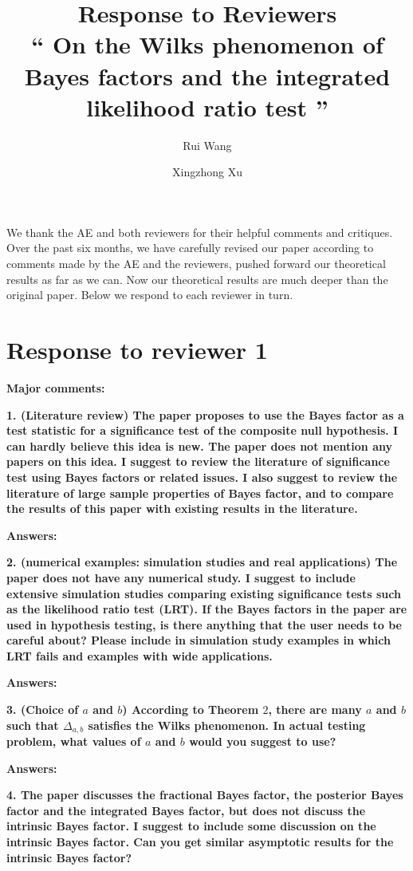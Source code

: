 \documentclass[11pt]{article}
\title{Response to Reviewers\\
    ``
    On the Wilks phenomenon of Bayes factors and the integrated likelihood ratio test
    ''
}
\author[1]{Rui Wang}
\author[1,2]{Xingzhong Xu}
\affil[1]{
School of Mathematics and Statistics, Beijing Institute of Technology, Beijing 
    100081,China
}
\affil[2]{
Beijing Key Laboratory on MCAACI, Beijing Institute of Technology, Beijing 100081,China
}
\theoremstyle{plain}
\theoremstyle{definition}
\theoremstyle{remark}
\begin{document}
\maketitle

We thank the AE and both reviewers for their helpful comments and critiques.
Over the past six months, we have carefully revised our paper according to comments made by the AE and the reviewers, pushed forward our theoretical results as far as we can.
Now our theoretical results are much deeper than the original paper. 
Below we respond to each reviewer in turn.

\section{Response to reviewer 1}


\textbf{Major comments:}

\textbf{1.
    (Literature review) The paper proposes to use the Bayes factor as a test statistic for a significance test of the composite null hypothesis. I can hardly believe this idea is new. The paper does not mention any papers on this idea. I suggest to review the literature of significance test using Bayes factors or related issues. I also suggest to review the literature of large sample properties of Bayes factor, and to compare the results of this paper with existing results in the literature.
}


\textbf{Answers:}

\textbf{
    2.
    (numerical examples: simulation studies and real applications) The paper does not have any numerical study. I suggest to include extensive simulation studies comparing existing significance tests such as the likelihood ratio test (LRT). If the Bayes factors in the paper are used in hypothesis testing, is there anything that the user needs to be careful about? Please include in simulation study examples in which LRT fails and examples with wide applications.
}


\textbf{Answers:}


\textbf{
    3. (Choice of $a$ and $b$) According to Theorem $2$, there are many $a$ and $b$ such that $\Delta_{a,b}$ satisfies the Wilks phenomenon.
    In actual testing problem, what values of $a$ and $b$ would you suggest to use?
}

\textbf{Answers:}





\textbf{
    4. The paper discusses the fractional Bayes factor, the posterior Bayes factor and the integrated Bayes factor, but does not discuss the intrinsic Bayes factor. I suggest to include some discussion on the intrinsic Bayes factor. Can you get similar asymptotic results for the intrinsic Bayes factor?
}
\end{document}

